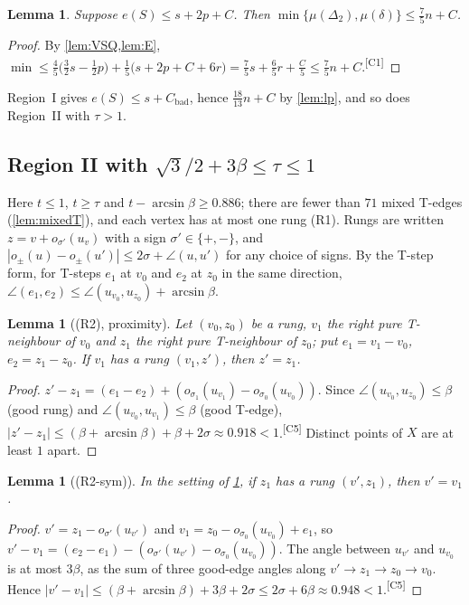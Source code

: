 \documentclass[11pt]{amsart}
\newtheorem{lemma}[theorem]{Lemma}
\theoremstyle{definition}
\theoremstyle{remark}
\newcommand{\Dt}{\Delta_2}
\newcommand{\mult}{\mu}
\newcommand{\chk}[1]{\textsuperscript{[#1]}}
\begin{document}
\begin{lemma}\label{lem:lp2}
Suppose $e(S)\le s+2p+C$. Then $\min\{\mult(\Dt),\mult(\delta)\}\le\frac75 n+C$.
\end{lemma}
\begin{proof}
By \cref{lem:VSQ,lem:E},
$\min\le\frac45\bigl(\frac32 s-\frac12p\bigr)+\frac15\bigl(s+2p+C+6r\bigr)=\frac75 s+\frac65 r+\frac C5\le\frac75n+C$.\chk{C1}
\end{proof}

Region~I gives $e(S)\le s+C_{\mathrm{bad}}$, hence $\frac{18}{13}n+C$ by \cref{lem:lp}, and so does Region~II with $\tau>1$.

\subsection*{Region II with \texorpdfstring{$\sqrt3/2+3\beta\le\tau\le1$}{sqrt3/2 + 3 beta <= tau <= 1}}
Here $t\le1$, $t\ge\tau$ and $t-\arcsin\beta\ge0.886$; there are fewer than $71$ mixed T-edges (\cref{lem:mixedT}), and each vertex has at most one rung (R1). Rungs are written $z=v+o_{\sigma'}(u_v)$ with a sign $\sigma'\in\{+,-\}$, and $|o_{\pm}(u)-o_{\pm}(u')|\le2\sigma+\angle(u,u')$ for any choice of signs. By the T-step form, for T-steps $e_1$ at $v_0$ and $e_2$ at $z_0$ in the same direction, $\angle(e_1,e_2)\le\angle(u_{v_0},u_{z_0})+\arcsin\beta$.

\begin{lemma}[(R2), proximity]\label{lem:R2}
Let $(v_0,z_0)$ be a rung, $v_1$ the right pure T-neighbour of $v_0$ and $z_1$ the right pure T-neighbour of $z_0$; put $e_1=v_1-v_0$, $e_2=z_1-z_0$. If $v_1$ has a rung $(v_1,z')$, then $z'=z_1$.
\end{lemma}
\begin{proof}
$z'-z_1=(e_1-e_2)+(o_{\sigma_1}(u_{v_1})-o_{\sigma_0}(u_{v_0}))$. Since $\angle(u_{v_0},u_{z_0})\le\beta$ (good rung) and $\angle(u_{v_0},u_{v_1})\le\beta$ (good T-edge), $|z'-z_1|\le(\beta+\arcsin\beta)+\beta+2\sigma\approx0.918<1$.\chk{C5} Distinct points of $X$ are at least $1$ apart.
\end{proof}

\begin{lemma}[(R2-sym)]\label{lem:R2sym}
In the setting of \cref{lem:R2}, if $z_1$ has a rung $(v',z_1)$, then $v'=v_1$.
\end{lemma}
\begin{proof}
$v'=z_1-o_{\sigma'}(u_{v'})$ and $v_1=z_0-o_{\sigma_0}(u_{v_0})+e_1$, so $v'-v_1=(e_2-e_1)-(o_{\sigma'}(u_{v'})-o_{\sigma_0}(u_{v_0}))$. The angle between $u_{v'}$ and $u_{v_0}$ is at most $3\beta$, as the sum of three good-edge angles along $v'\to z_1\to z_0\to v_0$. Hence $|v'-v_1|\le(\beta+\arcsin\beta)+3\beta+2\sigma\le2\sigma+6\beta\approx0.948<1$.\chk{C5}
\end{proof}
\end{document}
